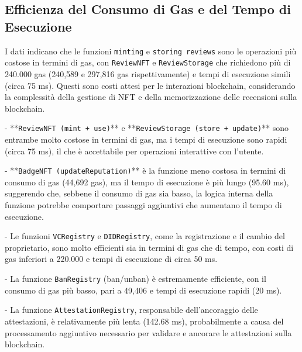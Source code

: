         \subsection{Efficienza del Consumo di Gas e del Tempo di Esecuzione}
            I dati indicano che le funzioni \texttt{minting} e \texttt{storing reviews} sono le operazioni più costose in termini di gas, con \texttt{ReviewNFT} e \texttt{ReviewStorage} che richiedono più di 240.000 gas (240,589 e 297,816 gas rispettivamente) e tempi di esecuzione simili (circa 75 ms). Questi sono costi attesi per le interazioni blockchain, considerando la complessità della gestione di NFT e della memorizzazione delle recensioni sulla blockchain.
        
                - **\texttt{ReviewNFT (mint + use)}** e **\texttt{ReviewStorage (store + update)}** sono entrambe molto costose in termini di gas, ma i tempi di esecuzione sono rapidi (circa 75 ms), il che è accettabile per operazioni interattive con l'utente.
        
                - **\texttt{BadgeNFT (updateReputation)}** è la funzione meno costosa in termini di consumo di gas (44,692 gas), ma il tempo di esecuzione è più lungo (95.60 ms), suggerendo che, sebbene il consumo di gas sia basso, la logica interna della funzione potrebbe comportare passaggi aggiuntivi che aumentano il tempo di esecuzione.
        
                - Le funzioni \texttt{VCRegistry} e \texttt{DIDRegistry}, come la registrazione e il cambio del proprietario, sono molto efficienti sia in termini di gas che di tempo, con costi di gas inferiori a 220.000 e tempi di esecuzione di circa 50 ms.
        
                - La funzione \texttt{BanRegistry} (ban/unban) è estremamente efficiente, con il consumo di gas più basso, pari a 49,406 e tempi di esecuzione rapidi (20 ms).
        
                - La funzione \texttt{AttestationRegistry}, responsabile dell'ancoraggio delle attestazioni, è relativamente più lenta (142.68 ms), probabilmente a causa del processamento aggiuntivo necessario per validare e ancorare le attestazioni sulla blockchain.
        
